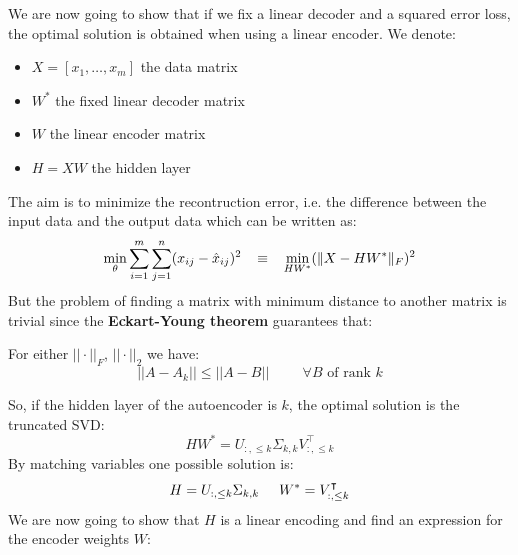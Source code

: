 We are now going to show that if we fix a linear decoder and a squared error loss, the optimal solution is obtained when using a linear encoder. We denote:
\begin{itemize}
    \item $X = [x_1, \dots, x_m]$ the data matrix
    \item $W^*$ the fixed linear decoder matrix
    \item $W$ the linear encoder matrix
    \item $H = XW$ the hidden layer
\end{itemize}
The aim is to minimize the recontruction error, i.e. the difference between the input data and the output data which can be written as:
\[
    \min_{\theta} \sum_{i=1}^m \sum_{j=1}^n (x_{ij} - \hat{x}_{ij})^2 \hspace{0.3cm} \equiv \hspace{0.3cm} \min_{HW^*} (\|X - HW^*\|_F)^2
\]
But the problem of finding a matrix with minimum distance to another matrix is trivial since the \textbf{Eckart-Young theorem} guarantees that:\\
\begin{theorem}
For either $||\cdot||_F$, $||\cdot||_2$ we have:
\[
    ||A - A_k|| \leq ||A - B|| \hspace{1cm} \forall B \text{ of rank } k
\]
\end{theorem}
So, if the hidden layer of the autoencoder is $k$, the optimal solution is the truncated SVD:
\[
    HW^* = U_{:,\leq k}\Sigma_{k,k}V_{:,\leq k}^\intercal
\]
By matching variables one possible solution is:
\[
    H = U_{:,\leq k}\Sigma_{k,k} \hspace{0.5cm} W^* = V_{:,\leq k}^\intercal
\]
We are now going to show that $H$ is a linear encoding and find an expression for the encoder weights $W$:
